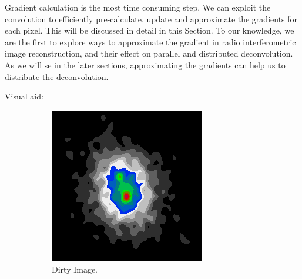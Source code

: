 Gradient calculation is the most time consuming step. We can exploit the convolution to efficiently pre-calculate, update and approximate the gradients for each pixel. This will be discussed in detail in this Section. To our knowledge, we are the first to explore ways to approximate the gradient in radio interferometric image reconstruction, and their effect on parallel and distributed deconvolution. As we will se in the later sections, approximating the gradients can help us to distribute the deconvolution. 

Visual aid:
\begin{figure}[h]
	\centering
	\begin{subfigure}[b]{0.3\linewidth}
		\includegraphics[width=\linewidth]{./chapters/03.distribution/simulated/dirty.png}
		\caption{Dirty Image.}
		\label{cd:efficient:aid:dirty}
	\end{subfigure}
	\begin{subfigure}[b]{0.3\linewidth}

\end{subfigure}
\end{figure}
